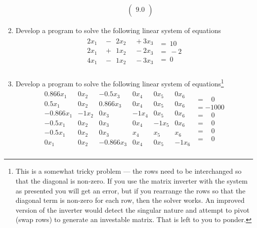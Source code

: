 \begin{enumerate}
\begin{enumerate}
\begin{gather}
\begin{pmatrix}
9.0 \\
\end{pmatrix}
\end{gather}
\end{enumerate}
\item Develop a program to solve the following linear system of equations
\begin{gather}
\begin{matrix}
2x_1 & ~-~~2x_2 & ~~+3x_3 \\
2x_1 & ~+~~1x_2 & ~~-2x_3 \\
4x_1 & ~-~~1x_2 & ~~-3x_3 \\
\end{matrix}
\begin{matrix}
=~10\\
=~-2\\
=~0\\
\end{matrix}
\end{gather}

\item Develop a program to solve the following linear system of equations\footnote{This is a somewhat tricky problem --- the rows need to be interchanged so that the diagonal is non-zero.  If you use the matrix inverter with the system as presented you will get an error,  but if you rearrange the rows so that the diagonal term is non-zero for each row, then the solver works.  An improved version of the inverter would detect the singular nature and attempt to pivot (swap rows) to generate an investable matrix.  That is left to you to ponder.}
\begin{gather}
\begin{matrix}
0.866x_1 & 0x_2 & -0.5x_3 & 0x_4 & 0x_5 & 0x_6 \\
0.5x_1 & 0x_2 & 0.866x_3 & 0x_4 & 0x_5 & 0x_6 \\
-0.866x_1 & -1x_2 & 0x_3 & -1x_4 & 0x_5 & 0x_6 \\
-0.5x_1 & 0x_2 & 0x_3 & 0x_4 & -1x_5 & 0x_6 \\
-0.5x_1 & 0x_2 & 0x_3 & x_4 & x_5 & x_6 \\
0x_1 & 0x_2 & -0.866x_3 & 0x_4 & 0x_5 & -1x_6 \\
\end{matrix}
\begin{matrix}
=~~~~0\\
=-1000\\
=~~~~0\\
=~~~~0\\
=~~~~0\\
=~~~~0\\
\end{matrix}
\end{gather}


\end{enumerate}
